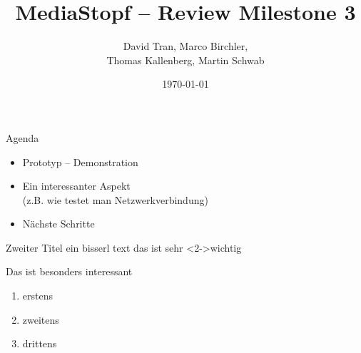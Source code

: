 \documentclass[]{beamer}
\title{MediaStopf -- Review Milestone 3}
\author{David Tran, Marco Birchler, \\ Thomas Kallenberg, Martin Schwab}
\institute{HSR Hochschule Rapperswil}
\date{ \today }
\begin{document}
\begin{frame}
  \titlepage
\end{frame}

\begin{frame}{Agenda}

\begin{itemize}[<+->]
\item Prototyp -- Demonstration
\item Ein interessanter Aspekt \\ (z.B. wie testet man Netzwerkverbindung)
\item Nächste Schritte
\end{itemize}

\end{frame}
\begin{frame}{Zweiter Titel}
ein bisserl text
das ist sehr \alert{<2->wichtig}
\begin{theorem}
Das ist besonders interessant
\end{theorem}

\begin{enumerate}
\item erstens
\item zweitens
\item drittens
\end{enumerate}


\end{frame}
\end{document}
